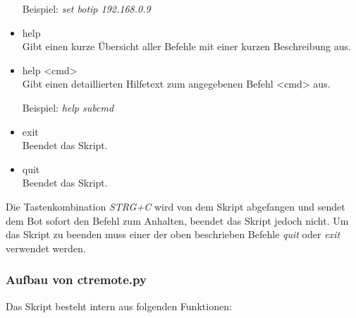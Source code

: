 \begin{itemize}
    Beispiel: \textit{set botip 192.168.0.9}
    \item help\\
    Gibt einen kurze Übersicht aller Befehle mit einer kurzen Beschreibung aus.
    \item help <cmd>\\
    Gibt einen detaillierten Hilfetext zum angegebenen Befehl <cmd> aus.
    
    Beispiel: \textit{help subcmd}
    \item exit\\
    Beendet das Skript.
    \item quit\\
    Beendet das Skript.
\end{itemize}
Die Tastenkombination \textit{STRG+C} wird von dem Skript abgefangen und sendet dem Bot sofort den Befehl zum Anhalten, beendet das Skript jedoch nicht. Um das Skript zu beenden muss einer der oben beschrieben Befehle \textit{quit} oder \textit{exit} verwendet werden.

\subsubsection{Aufbau von ctremote.py}
Das Skript besteht intern aus folgenden Funktionen:

